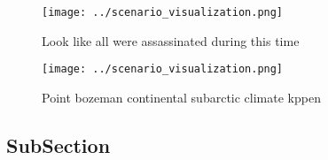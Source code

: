 \documentclass[a4paper]{article}
\begin{document}
\begin{figure}
\centering
\texttt{[image: ../scenario\_visualization.png]}
\caption{Look like all were assassinated during this time 
}
\end{figure}
 
\begin{figure}
\centering
\texttt{[image: ../scenario\_visualization.png]}
\caption{Point bozeman continental subarctic climate kppen
}
\end{figure}
 
\subsection{SubSection}
\end{document}
